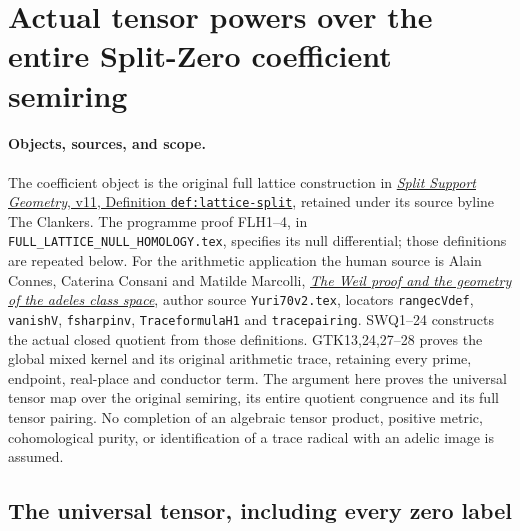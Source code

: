 \section{Actual tensor powers over the entire Split-Zero coefficient semiring}
\label{sec:global-full-lattice-tensor}

\paragraph{Objects, sources, and scope.}
The coefficient object is the original full lattice construction in
\href{https://github.com/KokunoYumeto/zeta-function-research-reader/blob/a2851f9eb352e7e4376bc629de86fa4ed9c1c434/workbenches/splitzero-tandem/foundations/split-support-geometry-v11/split_support_geometry_arithmetic_curve_v11.tex}{\emph{Split Support Geometry}, v11, Definition \texttt{def:lattice-split}},
retained under its source byline The Clankers. The programme proof
FLH1--4, in \nolinkurl{FULL_LATTICE_NULL_HOMOLOGY.tex}, specifies its
null differential; those definitions are repeated below.
For the arithmetic application the human source is Alain Connes,
Caterina Consani and Matilde Marcolli,
\href{https://arxiv.org/abs/math/0703392v1}{\emph{The Weil proof and
the geometry of the adeles class space}}, author source
\nolinkurl{Yuri70v2.tex}, locators \texttt{rangecVdef},
\texttt{vanishV}, \texttt{fsharpinv}, \texttt{TraceformulaH1}
and \texttt{tracepairing}. SWQ1--24 constructs the actual closed
quotient from those definitions. GTK13,24,27--28 proves the
global mixed kernel and its original arithmetic trace, retaining
every prime, endpoint, real-place and conductor term.
The argument here proves the universal tensor map over the original
semiring, its entire quotient congruence and its full tensor pairing.
No completion of an algebraic tensor product, positive metric,
cohomological purity, or identification of a trace radical with
an adelic image is assumed.

\subsection{The universal tensor, including every zero label}

